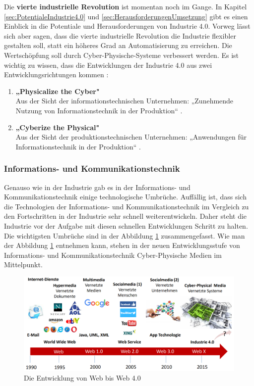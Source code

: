 Die \textbf{vierte industrielle Revolution} ist momentan noch im Gange. In Kapitel \ref{sec:PotentialeIndustrie4.0} und \ref{sec:HerausforderungenUmsetzung} gibt es einen Einblick in die Potentiale und Herausforderungen von Industrie 4.0. Vorweg lässt sich aber sagen, dass die vierte industrielle Revolution die Industrie flexibler gestalten soll, statt ein höheres Grad an Automatisierung zu erreichen. Die Wertschöpfung soll durch Cyber-Physische-Systeme verbessert werden. Es ist wichtig zu wissen, dass die Entwicklungen der Industrie 4.0 aus zwei Entwicklungsrichtungen kommen \cite{1}:
\begin{enumerate}
	\item \textbf{„Physicalize the Cyber"} \cite{1} \\ Aus der Sicht der informationstechnischen Unternehmen: „Zunehmende Nutzung von Informationstechnik in der Produktion“ \cite{1}.
	\item \textbf{„Cyberize the Physical"} \cite{1} \\ Aus der Sicht der produktionstechnischen Unternehmen: „Anwendungen für Informationstechnik in der Produktion“ \cite{1}.
\end{enumerate}

\subsubsection{Informations- und Kommunikationstechnik}\label{sec:WebRevolution}
Genauso wie in der Industrie gab es in der Informations- und Kommunikationstechnik einige technologische Umbrüche. Auffällig ist, dass sich die Technologien der Informations- und Kommunikationstechnik im Vergleich zu den Fortschritten in der Industrie sehr schnell weiterentwickeln. Daher steht die Industrie vor der Aufgabe mit diesen schnellen Entwicklungen Schritt zu halten. Die wichtigsten Umbrüche sind in der Abbildung \ref{fig:WebRevolutionBild} zusammengefasst. Wie man der Abbildung \ref{fig:WebRevolutionBild} entnehmen kann, stehen in der neuen Entwicklungsstufe von Informations- und Kommunikationstechnik Cyber-Physische Medien im Mittelpunkt.
\begin{figure}[h]
	\centering
	\includegraphics[width=1\linewidth]{Bilder/A2_EntwicklungWeb0-4}
	\caption{Die Entwicklung von Web bis Web 4.0 \cite{A2}}
	\label{fig:WebRevolutionBild}
\end{figure}

